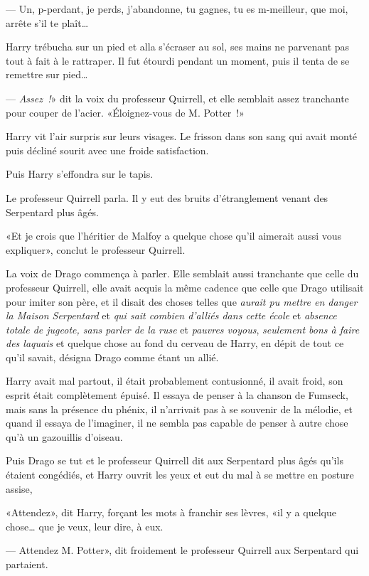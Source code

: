 --- Un, p-perdant, je perds, j'abandonne, tu gagnes, tu es m-meilleur, que moi, arrête s'il te plaît…

Harry trébucha sur un pied et alla s'écraser au sol, ses mains ne parvenant pas tout à fait à le rattraper. Il fut étourdi pendant un moment, puis il tenta de se remettre sur pied…

--- \emph{Assez~!}» dit la voix du professeur Quirrell, et elle semblait assez tranchante pour couper de l'acier. «Éloignez-vous de M. Potter~!»

Harry vit l'air surpris sur leurs visages. Le frisson dans son sang qui avait monté puis décliné sourit avec une froide satisfaction.

Puis Harry s'effondra sur le tapis.

Le professeur Quirrell parla. Il y eut des bruits d'étranglement venant des Serpentard plus âgés.

«Et je crois que l'héritier de Malfoy a quelque chose qu'il aimerait aussi vous expliquer», conclut le professeur Quirrell.

La voix de Drago commença à parler. Elle semblait aussi tranchante que celle du professeur Quirrell, elle avait acquis la même cadence que celle que Drago utilisait pour imiter son père, et il disait des choses telles que \emph{aurait pu mettre en danger la Maison Serpentard} et \emph{qui sait combien d'alliés dans cette école} et \emph{absence totale de jugeote, sans parler de la ruse} et \emph{pauvres voyous}, \emph{seulement bons à faire des laquais} et quelque chose au fond du cerveau de Harry, en dépit de tout ce qu'il savait, désigna Drago comme étant un allié.

Harry avait mal partout, il était probablement contusionné, il avait froid, son esprit était complètement épuisé. Il essaya de penser à la chanson de Fumseck, mais sans la présence du phénix, il n'arrivait pas à se souvenir de la mélodie, et quand il essaya de l'imaginer, il ne sembla pas capable de penser à autre chose qu'à un gazouillis d'oiseau.

Puis Drago se tut et le professeur Quirrell dit aux Serpentard plus âgés qu'ils étaient congédiés, et Harry ouvrit les yeux et eut du mal à se mettre en posture assise,

«Attendez», dit Harry, forçant les mots à franchir ses lèvres, «il y a quelque chose… que je veux, leur dire, à eux.

--- Attendez M. Potter», dit froidement le professeur Quirrell aux Serpentard qui partaient.

